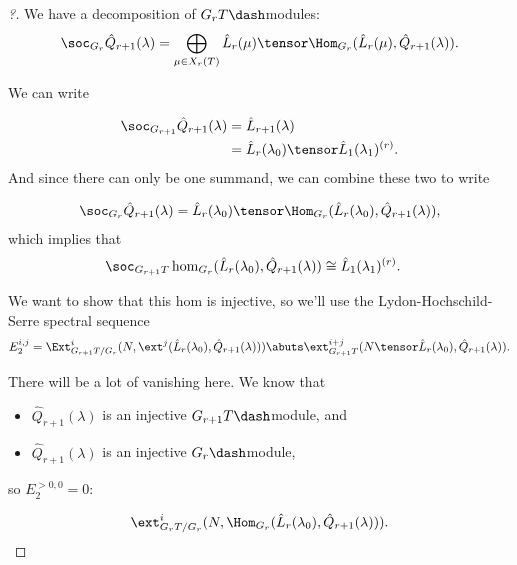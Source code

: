 \begin{proof}[?]

We have a decomposition of \(G_r T\dash\)modules:
\begin{align*}  
\soc_{G_r} \hat{Q}_{r+1}(\lambda) = \bigoplus_{\mu\in X_r(T)} \hat{L}_r(\mu) \tensor \Hom_{G_r}(\hat{L}_r(\mu), \hat{Q}_{r+1}(\lambda) )
.\end{align*}

We can write

\begin{align*}  
\soc_{G_{r+1}} \hat{Q}_{r+1}(\lambda) 
&= \hat{L}_{r+1}(\lambda) \\
&= \hat{L}_r(\lambda_0) \tensor \hat{L}_1(\lambda_1)^{(r)}
.\end{align*} And since there can only be one summand, we can combine
these two to write

\begin{align*}  
\soc_{G_r} \hat{Q}_{r+1}(\lambda) = \hat{L}_r(\lambda_0) \tensor \Hom_{G_r}(\hat{L}_r(\lambda_0), \hat{Q}_{r+1}(\lambda) )
,\end{align*} which implies that
\begin{align*}  
\soc_{G_{r+1} T} \hom_{G_r}(\hat{L}_r(\lambda_0), \hat{Q}_{r+1}(\lambda)  ) &\cong \hat{L}_1(\lambda_1)^{(r)}
.\end{align*}

We want to show that this hom is injective, so we'll use the
Lydon-Hochschild-Serre spectral sequence
\begin{align*}  
E_2^{i, j} = \Ext_{G_{r+1} T/G_r}^i (N, \ext^j( \hat{L}_r(\lambda_0), \hat{Q}_{r+1}(\lambda) )  )
\abuts
\ext^{i+j}_{G_{r+1} T} ( N\tensor \hat{L}_r(\lambda_0), \hat{Q}_{r+1}(\lambda) )
.\end{align*}

There will be a lot of vanishing here. We know that

\begin{itemize}
\tightlist
\item
  \(\hat{Q}_{r+1}(\lambda)\) is an injective \(G_{r+1}T\dash\)module,
  and
\item
  \(\hat{Q}_{r+1}(\lambda)\) is an injective \(G_{r}\dash\)module,
\end{itemize}

so \(E_2^{>0, 0} = 0\):

\begin{align*}  
\ext_{G_{r}T/G_r}^i(N, \Hom_{G_r}( \hat{L}_r(\lambda_0), \hat{Q}_{r+1}(\lambda) )  )
.\end{align*}


\end{proof}
